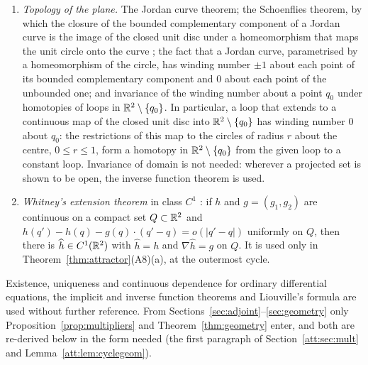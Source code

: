 \begin{enumerate}[label=\textup{(I\arabic*)}]
\begin{enumerate}[label=\textup{(\alph*)}]
\item The same statements hold at a hyperbolic fixed point of a $C^1$ local diffeomorphism; they are applied to the first-return map of a cycle on a transverse disc. For a cycle whose transverse multipliers satisfy $m_s<1<m_t$, flowing the local unstable curve of the return map gives the local unstable manifold of the cycle: a $C^1$ surface containing the cycle, whose tangent plane at a point $\mathbf a_0$ of the cycle is spanned by $\mathbf f(\mathbf a_0)$ and the eigenvector of the monodromy matrix for $m_t$, and whose points have backward orbits converging to the cycle.
\item A cycle all of whose transverse multipliers have modulus less than one is orbitally asymptotically stable: every neighbourhood $V$ of the cycle contains a neighbourhood $V'$ whose forward orbits remain in $V$ and have the cycle as $\omega$-limit set.
\end{enumerate}
\item \emph{Topology of the plane.} The Jordan curve theorem; the Schoenflies theorem, by which the closure of the bounded complementary component of a Jordan curve is the image of the closed unit disc under a homeomorphism that maps the unit circle onto the curve \cite{Thomassen92}; the fact that a Jordan curve, parametrised by a homeomorphism of the circle, has winding number $\pm1$ about each point of its bounded complementary component and $0$ about each point of the unbounded one; and invariance of the winding number about a point $q_0$ under homotopies of loops in $\mathbb R^2\setminus\{q_0\}$. In particular, a loop that extends to a continuous map of the closed unit disc into $\mathbb R^2\setminus\{q_0\}$ has winding number $0$ about $q_0$: the restrictions of this map to the circles of radius $r$ about the centre, $0\le r\le1$, form a homotopy in $\mathbb R^2\setminus\{q_0\}$ from the given loop to a constant loop. Invariance of domain is not needed: wherever a projected set is shown to be open, the inverse function theorem is used.
\item \emph{Whitney's extension theorem} in class $C^1$ \cite{Whitney34}: if $h$ and $g=(g_1,g_2)$ are continuous on a compact set $Q\subset\mathbb R^2$ and $h(q')-h(q)-g(q)\cdot(q'-q)=o(|q'-q|)$ uniformly on $Q$, then there is $\widehat h\in C^1(\mathbb R^2)$ with $\widehat h=h$ and $\nabla\widehat h=g$ on $Q$. It is used only in Theorem~\ref{thm:attractor}(A8)(a), at the outermost cycle.
\end{enumerate}
Existence, uniqueness and continuous dependence for ordinary differential equations, the implicit and inverse function theorems and Liouville's formula are used without further reference. From Sections~\ref{sec:adjoint}--\ref{sec:geometry} only Proposition~\ref{prop:multipliers} and Theorem~\ref{thm:geometry} enter, and both are re-derived below in the form needed (the first paragraph of Section~\ref{att:sec:mult} and Lemma~\ref{att:lem:cyclegeom}).

